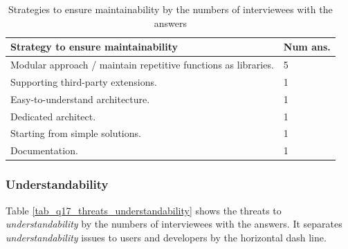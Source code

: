 \documentclass[3p, 12pt,authoryear]{elsarticle}
\begin{document}
\begin{table}[ht]
\centering
\begin{tabular}{ll}
\hline
Strategy to ensure maintainability & Num ans. \\ \hline
Modular approach / maintain repetitive functions as libraries. & 5 \\
Supporting third-party extensions. & 1 \\
Easy-to-understand architecture. & 1 \\
Dedicated architect. & 1 \\
Starting from simple solutions. & 1 \\
Documentation. & 1 \\ \hline
\end{tabular}
\caption{\label{tab_q16_strategies_maintainability}Strategies to ensure
maintainability by the numbers of interviewees with the answers}
\end{table}

\subsubsection{Understandability} \label{sec_interview_understandability}


Table \ref{tab_q17_threats_understandability} shows the threats to
\textit{understandability} by the numbers of interviewees with the answers. It
separates \textit{understandability} issues to users and developers by the
horizontal dash line.
\end{document}
